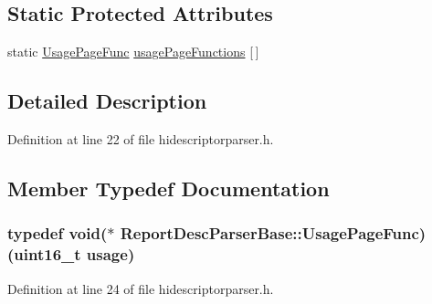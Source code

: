 \subsection*{\-Static \-Protected \-Attributes}
\begin{DoxyCompactItemize}
\item 
static \hyperlink{class_report_desc_parser_base_aeb139df01922910be7558b3c3a893db2}{\-Usage\-Page\-Func} \hyperlink{class_report_desc_parser_base_af91679187bb24d185979b3ec045c215b}{usage\-Page\-Functions} \mbox{[}$\,$\mbox{]}
\end{DoxyCompactItemize}


\subsection{\-Detailed \-Description}


\-Definition at line 22 of file hidescriptorparser.\-h.



\subsection{\-Member \-Typedef \-Documentation}
\hypertarget{class_report_desc_parser_base_aeb139df01922910be7558b3c3a893db2}{
\subsubsection[{\-Usage\-Page\-Func}]{\setlength{\rightskip}{0pt plus 5cm}typedef void($\ast$ {\bf \-Report\-Desc\-Parser\-Base\-::\-Usage\-Page\-Func})(uint16\-\_\-t usage)}}\label{class_report_desc_parser_base_aeb139df01922910be7558b3c3a893db2}


\-Definition at line 24 of file hidescriptorparser.\-h.



